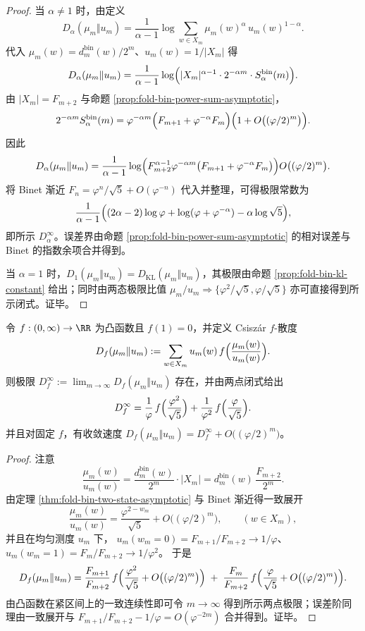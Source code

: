 \begin{proof}
当 \(\alpha\neq 1\) 时，由定义
\[
D_\alpha(\mu_m\Vert u_m)
=\frac{1}{\alpha-1}\log\sum_{w\in X_m}\mu_m(w)^\alpha\,u_m(w)^{1-\alpha}.
\]
代入 \(\mu_m(w)=d^{\mathrm{bin}}_m(w)/2^m\)、\(u_m(w)=1/|X_m|\) 得
\[
D_\alpha(\mu_m\Vert u_m)
=\frac{1}{\alpha-1}\log\Bigl(|X_m|^{\alpha-1}\cdot 2^{-\alpha m}\cdot S_\alpha^{\mathrm{bin}}(m)\Bigr).
\]
由 \(|X_m|=F_{m+2}\) 与命题 \ref{prop:fold-bin-power-sum-asymptotic}，
\[
2^{-\alpha m}S_\alpha^{\mathrm{bin}}(m)
=\varphi^{-\alpha m}\Bigl(F_{m+1}+\varphi^{-\alpha}F_m\Bigr)\Bigl(1+O\bigl((\varphi/2)^m\bigr)\Bigr).
\]
因此
\[
D_\alpha(\mu_m\Vert u_m)
=\frac{1}{\alpha-1}\log\Bigl(F_{m+2}^{\alpha-1}\varphi^{-\alpha m}\bigl(F_{m+1}+\varphi^{-\alpha}F_m\bigr)\Bigr)
O\bigl((\varphi/2)^m\bigr).
\]
将 Binet 渐近 \(F_n=\varphi^n/\sqrt5+O(\varphi^{-n})\) 代入并整理，可得极限常数为
\[
\frac{1}{\alpha-1}\Bigl((2\alpha-2)\log\varphi+\log(\varphi+\varphi^{-\alpha})-\alpha\log\sqrt5\Bigr),
\]
即所示 \(D_\alpha^\infty\)。误差界由命题 \ref{prop:fold-bin-power-sum-asymptotic} 的相对误差与 Binet 的指数余项合并得到。
\par
当 \(\alpha=1\) 时，\(D_1(\mu_m\Vert u_m)=D_{\mathrm{KL}}(\mu_m\Vert u_m)\)，其极限由命题 \ref{prop:fold-bin-kl-constant} 给出；同时由两态极限比值 \(\mu_m/u_m\Rightarrow\{\varphi^2/\sqrt5,\varphi/\sqrt5\}\) 亦可直接得到所示闭式。证毕。
\end{proof}

\begin{proposition}\label{prop:fold-bin-f-divergence-collapse}
令 \(f:(0,\infty)\to\RR\) 为凸函数且 \(f(1)=0\)，并定义 Csiszár \(f\)-散度
\[
D_f(\mu_m\Vert u_m):=\sum_{w\in X_m}u_m(w)\,f\Bigl(\frac{\mu_m(w)}{u_m(w)}\Bigr).
\]
则极限 \(D_f^\infty:=\lim_{m\to\infty}D_f(\mu_m\Vert u_m)\) 存在，并由两点闭式给出
\[
D_f^\infty=\frac{1}{\varphi}\,f\Bigl(\frac{\varphi^2}{\sqrt5}\Bigr)+\frac{1}{\varphi^2}\,f\Bigl(\frac{\varphi}{\sqrt5}\Bigr).
\]
并且对固定 \(f\)，有收敛速度 \(D_f(\mu_m\Vert u_m)=D_f^\infty+O\bigl((\varphi/2)^m\bigr)\)。
\end{proposition}

\begin{proof}
注意
\[
\frac{\mu_m(w)}{u_m(w)}=\frac{d^{\mathrm{bin}}_m(w)}{2^m}\cdot |X_m|
=d^{\mathrm{bin}}_m(w)\,\frac{F_{m+2}}{2^m}.
\]
由定理 \ref{thm:fold-bin-two-state-asymptotic} 与 Binet 渐近得一致展开
\[
\frac{\mu_m(w)}{u_m(w)}
=\frac{\varphi^{2-w_m}}{\sqrt5}+O\bigl((\varphi/2)^m\bigr),
\qquad (w\in X_m),
\]
并且在均匀测度 \(u_m\) 下，
\(
u_m(w_m=0)=F_{m+1}/F_{m+2}\to 1/\varphi
\)、
\(
u_m(w_m=1)=F_m/F_{m+2}\to 1/\varphi^2
\)。
于是
\[
D_f(\mu_m\Vert u_m)
=\frac{F_{m+1}}{F_{m+2}}\,f\Bigl(\frac{\varphi^2}{\sqrt5}+O\bigl((\varphi/2)^m\bigr)\Bigr)
\;+\;\frac{F_m}{F_{m+2}}\,f\Bigl(\frac{\varphi}{\sqrt5}+O\bigl((\varphi/2)^m\bigr)\Bigr).
\]
由凸函数在紧区间上的一致连续性即可令 \(m\to\infty\) 得到所示两点极限；误差阶同理由一致展开与 \(F_{m+1}/F_{m+2}-1/\varphi=O(\varphi^{-2m})\) 合并得到。证毕。
\end{proof}

